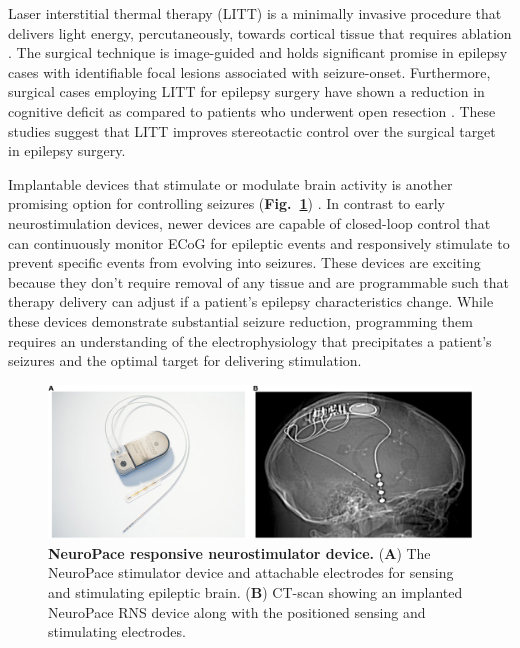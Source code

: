Laser interstitial thermal therapy (LITT) is a minimally invasive procedure that delivers light energy, percutaneously, towards cortical tissue that requires ablation \cite{tovar-spinoza2013use, medvid2015current}. The surgical technique is image-guided and holds significant promise in epilepsy cases with identifiable focal lesions associated with seizure-onset. Furthermore, surgical cases employing LITT for epilepsy surgery have shown a reduction in cognitive deficit as compared to patients who underwent open resection \cite{drane2015better}. These studies suggest that LITT improves stereotactic control over the surgical target in epilepsy surgery.

Implantable devices that stimulate or modulate brain activity is another promising option for controlling seizures (\textbf{Fig.~\ref{implantable_devices}}) \cite{morrell2011responsive}. In contrast to early neurostimulation devices, newer devices are capable of closed-loop control that can continuously monitor ECoG for epileptic events and responsively stimulate to prevent specific events from evolving into seizures. These devices are exciting because they don't require removal of any tissue and are programmable such that therapy delivery can adjust if a patient's epilepsy characteristics change. While these devices demonstrate substantial seizure reduction, programming them requires an understanding of the electrophysiology that precipitates a patient's seizures and the optimal target for delivering stimulation. 

\begin{figure}
\centering
\includegraphics[width=\textwidth]{implantable_devices}
\caption[NeuroPace RNS Device]{\textbf{NeuroPace responsive neurostimulator device.} (\textbf{A}) The NeuroPace stimulator device and attachable electrodes for sensing and stimulating epileptic brain. (\textbf{B}) CT-scan showing an implanted NeuroPace RNS device along with the positioned sensing and stimulating electrodes.}
\label{implantable_devices}
\end{figure}
